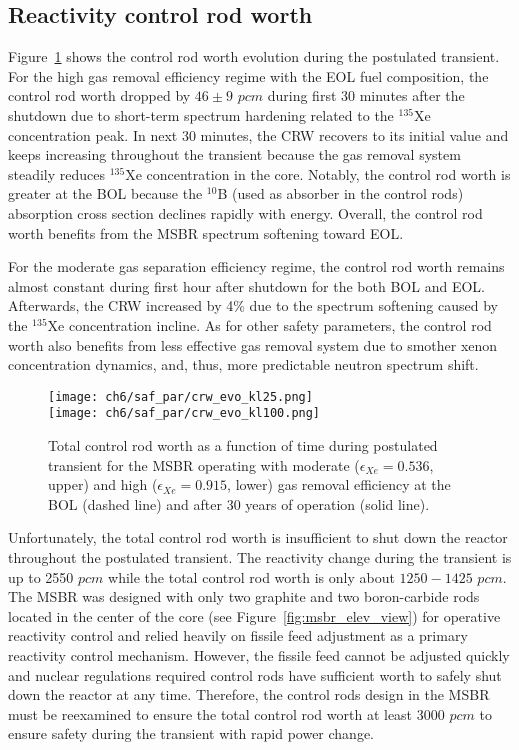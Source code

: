 \subsection{Reactivity control rod worth}
Figure~\ref{fig:lf-msbr-crw-evo} shows the control rod worth evolution 
during the postulated transient. For the high gas removal efficiency regime 
with the \gls{EOL} fuel composition, the control rod worth dropped by $46\pm9$ 
$pcm$ during first 30 minutes after the shutdown due to short-term spectrum 
hardening related to the $^{135}$Xe concentration peak. In next 30 minutes, 
the CRW recovers to its initial value and keeps increasing throughout the 
transient because the gas removal system steadily reduces $^{135}$Xe 
concentration in the core. Notably, the control rod worth is greater at the 
\gls{BOL} because the $^{10}$B (used as absorber in the control rods) 
absorption cross section declines rapidly with energy. Overall, the control 
rod worth benefits from the \gls{MSBR} spectrum softening toward \gls{EOL}.

For the moderate gas separation efficiency regime, the control rod worth 
remains almost constant during first hour after shutdown for the both 
\gls{BOL} and \gls{EOL}. Afterwards, the CRW increased by 4\% due to the 
spectrum softening caused by the $^{135}$Xe concentration incline. As for 
other safety parameters, the control rod worth also benefits 
from less effective gas removal system due to smother xenon concentration 
dynamics, and, thus, more predictable neutron spectrum shift. 
\begin{figure}[htbp!] %
	\centering
	\texttt{[image: ch6/saf\_par/crw\_evo\_kl25.png]}\\
	\vspace{-10mm}
	\hspace{+0.05mm}
	\texttt{[image: ch6/saf\_par/crw\_evo\_kl100.png]}
	\vspace{-3mm}
	\caption{Total control rod worth as a function of time during 
		postulated transient
for the \gls{MSBR} operating with moderate 
		($\epsilon_{Xe}=0.536$, upper) and high ($\epsilon_{Xe}=0.915$, lower) 
		gas removal efficiency at the \gls{BOL} (dashed line) and after 30 
		years of operation (solid line).}
	\label{fig:lf-msbr-crw-evo}
\end{figure}

Unfortunately, the total control rod worth is insufficient to shut down the 
reactor throughout the postulated transient. The reactivity change during the 
transient is up to 2550 $pcm$ while the total control rod worth is only about 
$1250-1425$ $pcm$. The \gls{MSBR} was designed with only two graphite and two 
boron-carbide rods located in the center of the core (see 
Figure~\ref{fig:msbr_elev_view}) for operative reactivity control and relied 
heavily on fissile feed adjustment as a primary reactivity control 
mechanism. However, the fissile feed cannot be adjusted quickly and nuclear  
regulations required control rods have sufficient worth to safely shut down 
the reactor at any time. Therefore, the control rods design in the \gls{MSBR} 
must be reexamined to ensure the total control rod worth at least 3000 $pcm$ 
to ensure safety during the transient with rapid power change.


